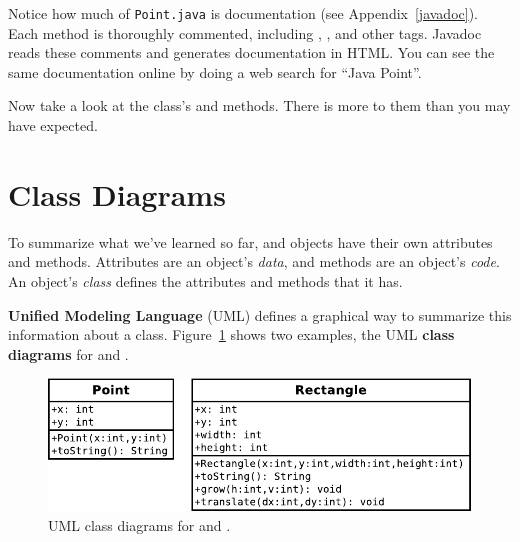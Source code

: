 Notice how much of {\tt Point.java} is documentation (see Appendix~\ref{javadoc}).
Each method is thoroughly commented, including , , and other tags.
Javadoc reads these comments and generates documentation in HTML.
You can see the same documentation online by doing a web search for ``Java Point''.

Now take a look at the  class's  and  methods.
There is more to them than you may have expected.






\section{Class Diagrams}
\label{UML}

To summarize what we've learned so far,  and  objects have their own attributes and methods.
Attributes are an object's {\em data}, and methods are an object's {\em code}.
An object's {\em class} defines the attributes and methods that it has.


{\bf Unified Modeling Language} (UML) defines a graphical way to summarize this information about a  class.
Figure~\ref{fig.umlPoint} shows two examples, the UML {\bf class diagrams} for  and .

\begin{figure}[!ht]
\begin{center}
\includegraphics{figs/point-rect.pdf}
\caption{UML class diagrams for  and .}
\label{fig.umlPoint}
\end{center}
\end{figure}

